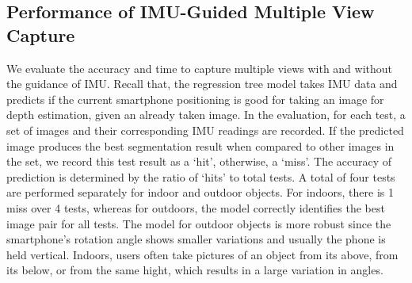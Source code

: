 



\subsection{Performance of IMU-Guided Multiple View Capture}

We evaluate the accuracy and time to capture multiple views with and without the guidance of IMU. Recall that, the regression tree model takes IMU data and predicts if the current smartphone positioning is good for taking an image for depth estimation, given an already taken image. In the evaluation, for each test, a set of images and their corresponding IMU readings are recorded. If the predicted image produces the best segmentation result when compared to other images in the set, we record this test result as a `hit', otherwise, a `miss'. The accuracy of prediction is determined by the ratio of `hits' to total tests. A total of four tests are performed separately for indoor and outdoor objects. For indoors, there is 1 miss over 4 tests, whereas for outdoors, the model correctly identifies the best image pair for all tests. The model for outdoor objects is more robust since the smartphone's rotation angle shows smaller variations and usually the phone is held vertical. Indoors, users often take pictures of an object from its above, from its below, or from the same hight, which results in a large variation in angles.

